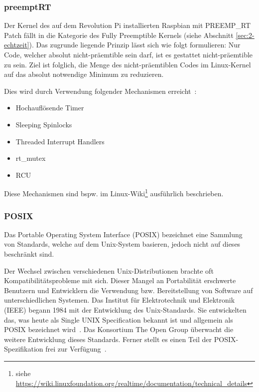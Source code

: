 \subsubsection{preemptRT%
        \label{sec:2-preemptRT}}

Der Kernel des auf dem Revolution Pi installierten Raspbian mit PREEMP\_RT Patch fällt 
in die Kategorie des \glqq{}Fully Preemptible Kernels\grqq{} (siehe Abschnitt \ref{sec:2-echtzeit}).
Das zugrunde liegende Prinzip lässt sich wie folgt formulieren: Nur Code, welcher absolut nicht-präemtible sein darf, ist es
gestattet nicht-präemtible zu sein. Ziel ist folglich, die Menge des nicht-präemtiblen 
Codes im Linux-Kernel auf das absolut notwendige Minimum zu reduzieren.

Dies wird durch Verwendung folgender Mechanismen erreicht~\citep[vgl.][]{web-linuxwiki-details}:

\begin{itemize}
  \item Hochauflösende Timer
  \item Sleeping Spinlocks
  \item Threaded Interrupt Handlers
  \item rt\_mutex
  \item RCU
\end{itemize}

Diese Mechanismen sind bspw. im Linux-Wiki\footnote{siehe \url{https://wiki.linuxfoundation.org/realtime/documentation/technical_details}} ausführlich beschrieben.

\subsubsection{POSIX%
        \label{sec:2-posix}}
Das Portable Operating System Interface (POSIX) bezeichnet eine Sammlung von Standards, 
welche auf dem Unix-System basieren, jedoch nicht auf dieses beschränkt sind.

Der Wechsel zwischen verschiedenen Unix-Distributionen brachte oft Kompatibilitätsprobleme mit sich. 
Dieser Mangel an Portabilität erschwerte Benutzern und Entwicklern die Verwendung bzw. Bereitstellung 
von Software auf unterschiedlichen Systemen. 
Das Institut für Elektrotechnik und Elektronik (IEEE) begann 1984 mit der Entwicklung des Unix-Standards.
Sie entwickelten das, was heute als Single UNIX Specification bekannt ist und allgemein als POSIX bezeichnet wird~\citep[vgl.][]{web-debianwiki-posix}.
Das Konsortium \glqq{}The Open Group\grqq{} überwacht die weitere Entwicklung dieses Standards.
Ferner stellt es einen Teil der POSIX-Spezifikation frei zur Verfügung~\citep[vgl.][]{web-opengroup-posix}.

